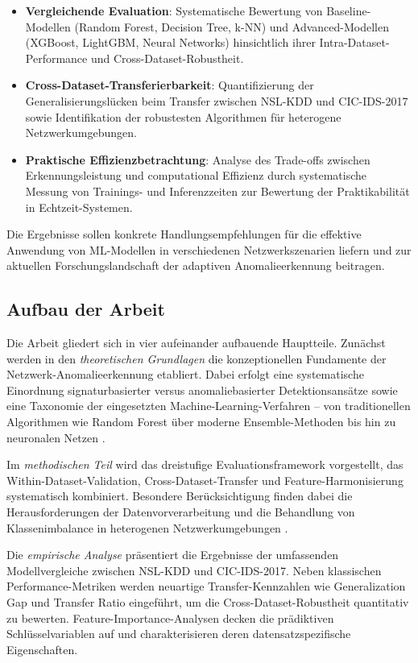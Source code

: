 \documentclass[11pt,a4paper]{article}
\begin{document}
    \begin{itemize}
        \item \textbf{Vergleichende Evaluation}: Systematische Bewertung von Baseline-Modellen (Random Forest, Decision Tree, k-NN) und Advanced-Modellen (XGBoost, LightGBM, Neural Networks) hinsichtlich ihrer Intra-Dataset-Performance und Cross-Dataset-Robustheit.
        \item \textbf{Cross-Dataset-Transferierbarkeit}: Quantifizierung der Generalisierungslücken beim Transfer zwischen NSL-KDD und CIC-IDS-2017 sowie Identifikation der robustesten Algorithmen für heterogene Netzwerkumgebungen.
        \item \textbf{Praktische Effizienzbetrachtung}: Analyse des Trade-offs zwischen Erkennungsleistung und computational Effizienz durch systematische Messung von Trainings- und Inferenzzeiten zur Bewertung der Praktikabilität in Echtzeit-Systemen.
    \end{itemize}

    Die Ergebnisse sollen konkrete Handlungsempfehlungen für die effektive Anwendung von ML-Modellen in verschiedenen Netzwerkszenarien liefern und zur aktuellen Forschungslandschaft der adaptiven Anomalieerkennung beitragen.

    \subsection{Aufbau der Arbeit}

    Die Arbeit gliedert sich in vier aufeinander aufbauende Hauptteile. Zunächst werden in den \textit{theoretischen Grundlagen} die konzeptionellen Fundamente der Netzwerk-Anomalieerkennung etabliert. Dabei erfolgt eine systematische Einordnung signaturbasierter versus anomaliebasierter Detektionsansätze sowie eine Taxonomie der eingesetzten Machine-Learning-Verfahren – von traditionellen Algorithmen wie Random Forest über moderne Ensemble-Methoden bis hin zu neuronalen Netzen \parencite{McHugh2000,Vinayakumar2019}.

    Im \textit{methodischen Teil} wird das dreistufige Evaluationsframework vorgestellt, das Within-Dataset-Validation, Cross-Dataset-Transfer und Feature-Harmonisierung systematisch kombiniert. Besondere Berücksichtigung finden dabei die Herausforderungen der Datenvorverarbeitung und die Behandlung von Klassenimbalance in heterogenen Netzwerkumgebungen \parencite{Gharib2016}.

    Die \textit{empirische Analyse} präsentiert die Ergebnisse der umfassenden Modellvergleiche zwischen NSL-KDD und CIC-IDS-2017. Neben klassischen Performance-Metriken werden neuartige Transfer-Kennzahlen wie Generalization Gap und Transfer Ratio eingeführt, um die Cross-Dataset-Robustheit quantitativ zu bewerten. Feature-Importance-Analysen decken die prädiktiven Schlüsselvariablen auf und charakterisieren deren datensatzspezifische Eigenschaften.
\end{document}
